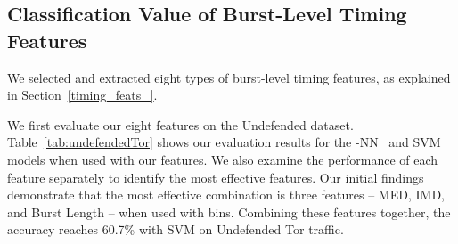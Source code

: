 \documentclass[USenglish,oneside,twocolumn]{article}
\begin{document}
\subsection{Classification Value of Burst-Level Timing Features}
\label{subsec:combiningtiming}



We selected and extracted eight types of burst-level timing features, as explained in Section~\ref{timing_feats_}.



We first evaluate our eight features on the Undefended dataset. Table~\ref{tab:undefendedTor} shows our evaluation results for the -NN~\cite{wang2014effective} and SVM~\cite{panchenko2016website} models when used with our features. We also examine the performance of each feature separately to identify the most effective features.
Our initial findings demonstrate that the most effective combination is three features -- MED, IMD, and Burst Length -- when used with  bins.
Combining these features together, the accuracy reaches 60.7\% with SVM on Undefended Tor traffic. 
\end{document}
